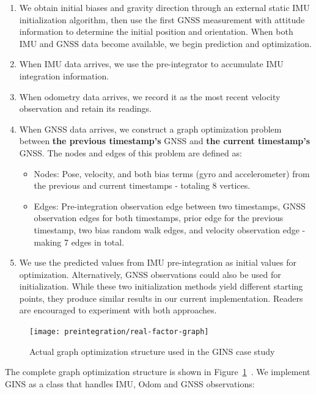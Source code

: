 \begin{enumerate}
	\item 
	We obtain initial biases and gravity direction through an external static IMU initialization algorithm, then use the first GNSS measurement with attitude information to determine the initial position and orientation. When both IMU and GNSS data become available, we begin prediction and optimization.
	
	\item When IMU data arrives, we use the pre-integrator to accumulate IMU integration information.
	
	\item When odometry data arrives, we record it as the most recent velocity observation and retain its readings.
	
	\item When GNSS data arrives, we construct a graph optimization problem between \textbf{the previous timestamp's} GNSS and \textbf{the current timestamp's} GNSS. The nodes and edges of this problem are defined as:
	\begin{itemize}
		\item Nodes: Pose, velocity, and both bias terms (gyro and accelerometer) from the previous and current timestamps - totaling 8 vertices.
		\item Edges: Pre-integration observation edge between two timestamps, GNSS observation edges for both timestamps, prior edge for the previous timestamp, two bias random walk edges, and velocity observation edge - making 7 edges in total.
	\end{itemize}
	
	\item We use the predicted values from IMU pre-integration as initial values for optimization. Alternatively, GNSS observations could also be used for initialization. While these two initialization methods yield different starting points, they produce similar results in our current implementation. Readers are encouraged to experiment with both approaches.
\end{enumerate}

\begin{figure}[!htp]
	\centering
	\texttt{[image: preintegration/real-factor-graph]}
	\caption{Actual graph optimization structure used in the GINS case study}
	\label{fig:real-factor-graph}
\end{figure}

The complete graph optimization structure is shown in Figure~\ref{fig:real-factor-graph}~. We implement GINS as a class that handles IMU, Odom and GNSS observations:

